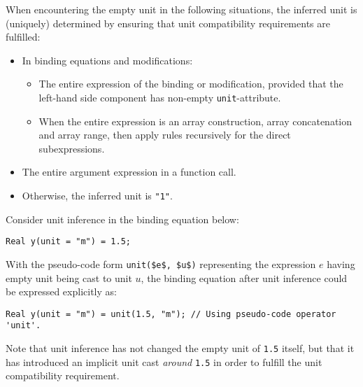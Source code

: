 When encountering the empty unit in the following situations, the inferred unit is (uniquely) determined by ensuring that unit compatibility requirements are fulfilled:
\begin{itemize}
\item
  In binding equations and modifications:
  \begin{itemize}
  \item The entire expression of the binding or modification, provided that the left-hand side component has non-empty \lstinline!unit!-attribute.
  \item When the entire expression is an array construction, array concatenation and array range, then apply rules recursively for the direct subexpressions.
  \end{itemize}
\item
  The entire argument expression in a function call.
\item
  Otherwise, the inferred unit is \lstinline!"1"!.
\end{itemize}

\begin{example}
Consider unit inference in the binding equation below:
\begin{lstlisting}[language=modelica]
Real y(unit = "m") = 1.5;
\end{lstlisting}
With the pseudo-code form \lstinline!unit($e$, $u$)! representing the expression $e$ having empty unit being cast to unit $u$, the binding equation after unit inference could be expressed explicitly as:
\begin{lstlisting}[language=modelica]
Real y(unit = "m") = unit(1.5, "m"); // Using pseudo-code operator 'unit'.
\end{lstlisting}
Note that unit inference has not changed the empty unit of \lstinline!1.5! itself, but that it has introduced an implicit unit cast \emph{around} \lstinline!1.5! in order to fulfill the unit compatibility requirement.
\end{example}

